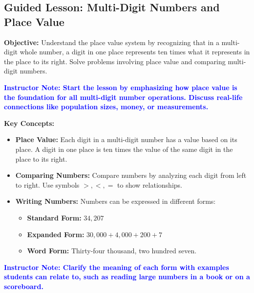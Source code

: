 \documentclass[12pt]{article}
\newcommand{\note}[1]{\textcolor{blue}{\textbf{Instructor Note: #1}}}
\begin{document}
\subsection*{Guided Lesson: Multi-Digit Numbers and Place Value}
\onehalfspacing

\begin{tcolorbox}[colframe=black!40, colback=gray!5, 
coltitle=black, colbacktitle=black!20, fonttitle=\bfseries\Large, 
title=Learning Objective, halign title=center, left=5pt, right=5pt, top=5pt, bottom=15pt]
\textbf{Objective:} Understand the place value system by recognizing that in a multi-digit whole number, a digit in one place represents ten times what it represents in the place to its right. Solve problems involving place value and comparing multi-digit numbers.

\note{Start the lesson by emphasizing how place value is the foundation for all multi-digit number operations. Discuss real-life connections like population sizes, money, or measurements.}
\end{tcolorbox}

\begin{tcolorbox}[colframe=black!60, colback=white, 
coltitle=black, colbacktitle=black!15, fonttitle=\bfseries\Large, 
title=Key Concepts and Vocabulary, halign title=center, left=10pt, right=10pt, top=10pt, bottom=15pt]
\textbf{Key Concepts:}
\begin{itemize}
    \item \textbf{Place Value:} Each digit in a multi-digit number has a value based on its place. A digit in one place is ten times the value of the same digit in the place to its right.
    \item \textbf{Comparing Numbers:} Compare numbers by analyzing each digit from left to right. Use symbols \( >, <, = \) to show relationships.
    \item \textbf{Writing Numbers:} Numbers can be expressed in different forms:
    \begin{itemize}
        \item \textbf{Standard Form:} \( 34,207 \)
        \item \textbf{Expanded Form:} \( 30,000 + 4,000 + 200 + 7 \)
        \item \textbf{Word Form:} Thirty-four thousand, two hundred seven.
    \end{itemize}
\end{itemize}

\note{Clarify the meaning of each form with examples students can relate to, such as reading large numbers in a book or on a scoreboard.}
\end{tcolorbox}
\end{document}
